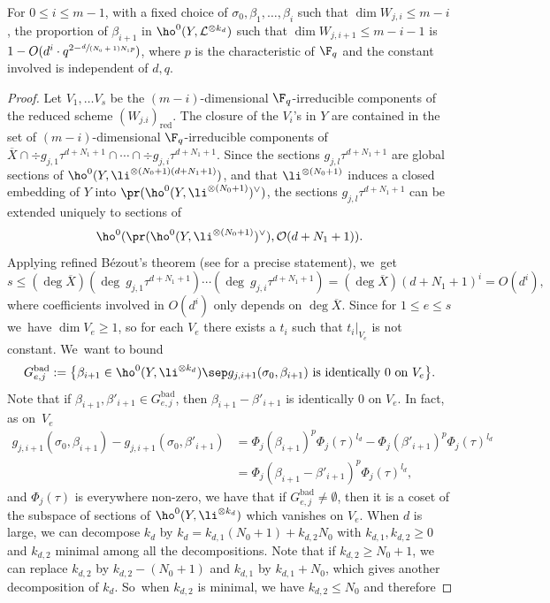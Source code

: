 \begin{lem}\label{reddim}
For $0\leq i\leq m-1$, with a fixed choice of $\sigma_0,\beta_1,\dots, \beta_i$ such that $\dim W_{j,i}\leq m-i$, the proportion of $\beta_{i+1}$ in $\ho^0(Y,\mathcal{L}^{\otimes k_d})$ such that $\dim W_{j,i+1} \leq m-i-1$ is $1-O(d^i\cdot q^{2-\sfrac{d}{(N_0+1)N_1p}})$, where $p$ is the characteristic of $\F_q$ and the constant involved is independent of $d,q$.
\end{lem}
\begin{proof}[Proof]
Let $V_1,\dots V_s$ be the $(m-i)$-dimensional $\F_q$-irreducible components of the reduced scheme $(W_{j.i})_{\mathrm{red}}$. The closure of the $V_i$'s in $Y$ are contained in the set of $(m-i)$-dimensional $\F_q$-irreducible components of $\overline{X}\cap \div g_{j,1}\tau^{d+N_1+1}\cap \cdots \cap \div g_{j,i}\tau^{d+N_1+1}$. Since the sections $g_{j,l}\tau^{d+N_1+1}$ are global sections of $\ho^0(Y, \li^{\otimes (N_0+1)(d+N_1+1)})$, and that $\li^{\otimes (N_0+1)}$ induces a closed embedding of $Y$ into $\pr(\ho^0(Y, \li^{\otimes (N_0+1)})^{\vee})$, the sections $g_{j,l}\tau^{d+N_1+1}$ can be extended uniquely to sections of
\[
\ho^0(\pr(\ho^0(Y, \li^{\otimes (N_0+1)})^{\vee}), \mathcal{O}(d+N_1+1)).
\]
Applying refined Bézout's theorem (see \cite[Th.\,12.3]{Fu84} for a precise statement), we~get
\[
s\leq (\deg \overline{X})(\deg \ g_{j,1}\tau^{d+N_1+1})\cdots (\deg \ g_{j,i}\tau^{d+N_1+1})=(\deg \overline{X})(d+N_1+1)^i=O(d^i),
\]
where coefficients involved in $O(d^i)$ only depends on $\deg \overline{X}$.
Since for $1\leq e\leq s$ we~have $\dim V_e\geq 1$, so for each $V_e$ there exists a $t_i$ such that $t_i|_{V_e}$ is not constant. We~want to bound
\[
G_{e,j}^{\mathrm{bad}}:=\bigl\{ \beta_{i+1}\in \ho^0(Y, \li^{\otimes k_d}) \sep g_{j, i+1}(\sigma_0, \beta_{i+1}) \text{ is identically }0 \text{ on }V_e \bigr\}.
\]
Note that if $\beta_{i+1},\beta'_{i+1}\!\in\! G_{e,j}^{\mathrm{bad}}$, then $\beta_{i+1}-\beta'_{i+1}$ is identically $0$ on $V_e$. In fact, as on~$V_e$
\begin{align*}
g_{j,i+1}(\sigma_0, \beta_{i+1})-g_{j,i+1}(\sigma_0, \beta'_{i+1})&= \Phi_j(\beta_{i+1})^p\Phi_j(\tau)^{l_d}-\Phi_j(\beta'_{i+1})^p\Phi_j(\tau)^{l_d} \\
&= \Phi_j(\beta_{i+1}-\beta'_{i+1})^p\Phi_j(\tau)^{l_d},
\end{align*}
and $\Phi_j(\tau)$ is everywhere non-zero, we have that if $G_{e,j}^{\mathrm{bad}}\not=\emptyset$, then it is a coset of the subspace of sections of $\ho^0(Y, \li^{\otimes k_d})$ which vanishes on $V_e$. When $d$ is large, we can decompose $k_d$ by $k_d=k_{d,1}(N_0+1)+k_{d,2}N_0$ with $k_{d,1},k_{d,2}\geq 0$ and $k_{d,2}$ minimal among all the decompositions. Note that if $k_{d,2}\geq N_0+1$, we can replace $k_{d,2}$ by $k_{d,2}-(N_0+1)$ and $k_{d,1}$ by $k_{d,1}+N_0$, which gives another decomposition of $k_d$. So~when $k_{d,2}$ is minimal, we have $k_{d,2}\leq N_0$ and therefore

\end{proof}

